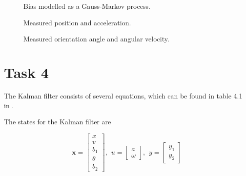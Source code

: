 \documentclass{article}
\begin{document}
\begin{figure}[!ht]
    \centering
    \caption{Bias modelled as a Gauss-Markov process.}
    \label{fig:disc_bias}
\end{figure}

\begin{figure}[!ht]
    \centering
    \caption{Measured position and acceleration.}
\end{figure}

\begin{figure}[!ht]
    \centering
    \caption{Measured orientation angle and angular velocity.}
\end{figure}

\section*{Task 4}
The Kalman filter consists of several equations, which can be found in table 4.1 in \cite{heftet}.

The states for the Kalman filter are

\begin{equation}
	\bm{x} =
	\begin{bmatrix}
		x \\ v \\ b_1 \\ \theta \\ b_2
	\end{bmatrix}
	, \hspace{5pt} u = 
	\begin{bmatrix}
		a \\ \omega
	\end{bmatrix}
	, \hspace{5pt} y = 
	\begin{bmatrix}
		y_1 \\ y_2
	\end{bmatrix}
\end{equation}
\end{document}
